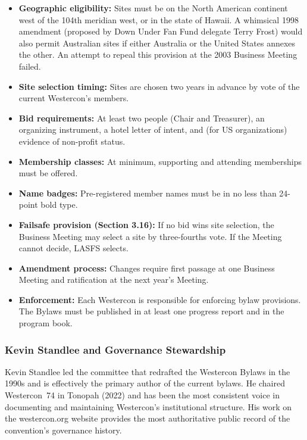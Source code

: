 \documentclass[11pt,letterpaper]{article}
\begin{document}
\begin{itemize}[leftmargin=2em]
  \item \textbf{Geographic eligibility:} Sites must be on the North American continent west of the 104th meridian west, or in the state of Hawaii. A whimsical 1998 amendment (proposed by Down Under Fan Fund delegate Terry Frost) would also permit Australian sites if either Australia or the United States annexes the other. An attempt to repeal this provision at the 2003 Business Meeting failed.
  \item \textbf{Site selection timing:} Sites are chosen two years in advance by vote of the current Westercon's members.
  \item \textbf{Bid requirements:} At least two people (Chair and Treasurer), an organizing instrument, a hotel letter of intent, and (for US organizations) evidence of non-profit status.
  \item \textbf{Membership classes:} At minimum, supporting and attending memberships must be offered.
  \item \textbf{Name badges:} Pre-registered member names must be in no less than 24-point bold type.
  \item \textbf{Failsafe provision (Section 3.16):} If no bid wins site selection, the Business Meeting may select a site by three-fourths vote. If the Meeting cannot decide, LASFS selects.
  \item \textbf{Amendment process:} Changes require first passage at one Business Meeting and ratification at the next year's Meeting.
  \item \textbf{Enforcement:} Each Westercon is responsible for enforcing bylaw provisions. The Bylaws must be published in at least one progress report and in the program book.
\end{itemize}

\subsubsection{Kevin Standlee and Governance Stewardship}

Kevin Standlee led the committee that redrafted the Westercon Bylaws in the 1990s and is effectively the primary author of the current bylaws. He chaired Westercon~74 in Tonopah (2022) and has been the most consistent voice in documenting and maintaining Westercon's institutional structure. His work on the westercon.org website provides the most authoritative public record of the convention's governance history.
\end{document}
